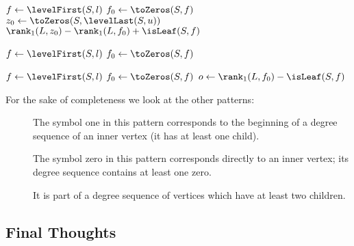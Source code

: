 \begin{algorithm}
\begin{algorithmic}
	\State $f \gets \levelFirst(S, l)$ 
	\State $f_0 \gets \toZeros(S, f)$
	\State $z_0 \gets \toZeros(S, \levelLast(S, u))$
	\State \Return $\rank_1(L, z_0) - \rank_1(L, f_0) + \isLeaf(S, f)$
\EndFunction
\end{algorithmic}
\end{algorithm}

\begin{algorithm}
\begin{algorithmic}	
 
	\State $f \gets \levelFirst(S, l)$ 
	\State $f_0 \gets \toZeros(S, f)$
	\State {}
\EndFunction
\end{algorithmic}
\end{algorithm}

\begin{algorithm}
\begin{algorithmic}
	\State $f \gets \levelFirst(S, l)$ 
	\State $f_0 \gets \toZeros(S, f)$
	\State $o \gets \rank_1(L, f_0) - \isLeaf(S, f)$ 
	\State {}
\EndFunction
\end{algorithmic}
\end{algorithm}

\bigbreak

For the sake of completeness we look at the other patterns:
\begin{description}
	\item[]
	The symbol one in this pattern corresponds to the beginning of a degree sequence of an inner vertex (it has at least one child).
	\item[]
	The symbol zero in this pattern corresponds directly to an inner vertex; its degree sequence contains at least one zero.
	\item[]
	It is part of a degree sequence of vertices which have at least two children.
\end{description}

\subsection{Final Thoughts}

